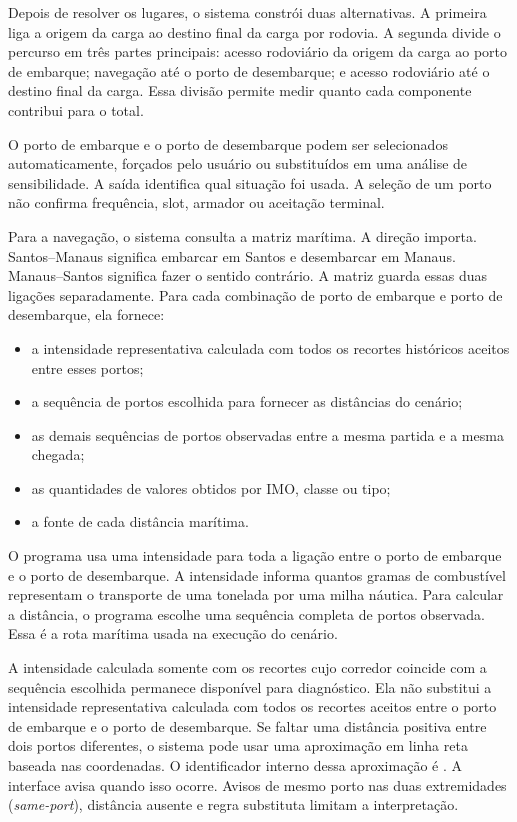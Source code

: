 Depois de resolver os lugares, o sistema constrói duas alternativas. A primeira liga a origem da carga ao destino final da carga por rodovia. A segunda divide o percurso em três partes principais: acesso rodoviário da origem da carga ao porto de embarque; navegação até o porto de desembarque; e acesso rodoviário até o destino final da carga. Essa divisão permite medir quanto cada componente contribui para o total.

O porto de embarque e o porto de desembarque podem ser selecionados automaticamente, forçados pelo usuário ou substituídos em uma análise de sensibilidade. A saída identifica qual situação foi usada. A seleção de um porto não confirma frequência, slot, armador ou aceitação terminal.

Para a navegação, o sistema consulta a matriz marítima. A direção importa. Santos--Manaus significa embarcar em Santos e desembarcar em Manaus. Manaus--Santos significa fazer o sentido contrário. A matriz guarda essas duas ligações separadamente. Para cada combinação de porto de embarque e porto de desembarque, ela fornece:

\begin{itemize}
  \item a intensidade representativa calculada com todos os recortes históricos aceitos entre esses portos;
  \item a sequência de portos escolhida para fornecer as distâncias do cenário;
  \item as demais sequências de portos observadas entre a mesma partida e a mesma chegada;
  \item as quantidades de valores obtidos por IMO, classe ou tipo;
  \item a fonte de cada distância marítima.
\end{itemize}

O programa usa uma intensidade para toda a ligação entre o porto de embarque e o porto de desembarque. A intensidade informa quantos gramas de combustível representam o transporte de uma tonelada por uma milha náutica. Para calcular a distância, o programa escolhe uma sequência completa de portos observada. Essa é a rota marítima usada na execução do cenário.

A intensidade calculada somente com os recortes cujo corredor coincide com a sequência escolhida permanece disponível para diagnóstico. Ela não substitui a intensidade representativa calculada com todos os recortes aceitos entre o porto de embarque e o porto de desembarque. Se faltar uma distância positiva entre dois portos diferentes, o sistema pode usar uma aproximação em linha reta baseada nas coordenadas. O identificador interno dessa aproximação é . A interface avisa quando isso ocorre. Avisos de mesmo porto nas duas extremidades (\emph{same-port}), distância ausente e regra substituta limitam a interpretação.

